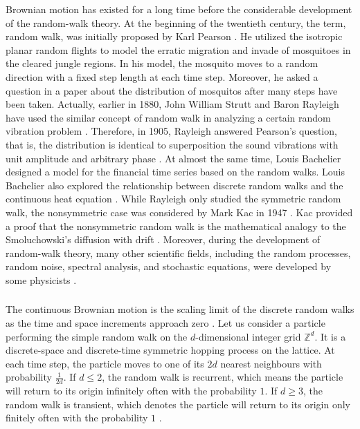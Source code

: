 Brownian motion has existed for a long time before the considerable
development of the random-walk theory. At the beginning of the
twentieth century, the term, random walk, was initially proposed by
Karl Pearson \cite{pearson1905problem}. He utilized the isotropic
planar random flights to model the erratic migration and invade of
mosquitoes in the cleared jungle regions. In his model, the mosquito
moves to a random direction with a fixed step length at each time
step. Moreover, he asked a question in a paper about the distribution
of mosquitos after many steps have been taken. Actually, earlier in
1880, John William Strutt and Baron Rayleigh have used the similar
concept of random walk in analyzing a certain random vibration problem
\cite{rayleigh1880xii}. Therefore, in 1905, Rayleigh
\cite{rayleigh1905problem} answered Pearson's question, that is, the
distribution is identical to superposition the sound vibrations with
unit amplitude and arbitrary phase \cite{de2012flying}. At almost the
same time, Louis Bachelier designed a model for the financial time
series based on the random walks. Louis Bachelier also explored the
relationship between discrete random walks and the continuous heat
equation \cite{bachelier1900theorie}. While Rayleigh only studied the
symmetric random walk, the nonsymmetric case was considered by Mark
Kac in 1947 \cite{kac1947random}. Kac provided a proof that the
nonsymmetric random walk is the mathematical analogy to the
Smoluchowski's diffusion with drift
\cite{smoluchowski1916drei}. Moreover, during the development of
random-walk theory, many other scientific fields, including the random
processes, random noise, spectral analysis, and stochastic equations,
were developed by some physicists \cite{einstein1905electrodynamics}
\cite{einstein1906theory} \cite{smoluchowski1916drei}.


\subsubsection{}

The continuous Brownian motion is the scaling limit of the discrete
random walks as the time and space increments approach zero
\cite{lawler2010random}\cite{varadhan1980lectures}. Let us consider a
particle performing the simple random walk on the $d$-dimensional
integer grid $\mathbb{Z}^d$. It is a discrete-space and discrete-time
symmetric hopping process \cite{redner2001guide} on the lattice. At
each time step, the particle moves to one of its $2d$ nearest
neighbours with probability $\frac{1}{2d}$. If $d \leq 2$, the random
walk is recurrent, which means the particle will return to its origin
infinitely often with the probability $1$. If $d \geq 3$, the random
walk is transient, which denotes the particle will return to its
origin only finitely often with the probability $1$
\cite{hughes1998random} \cite{lawler2010random}.


